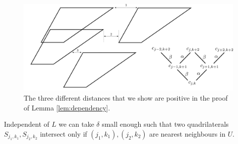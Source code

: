 \begin{figure}[!h]
  \includegraphics[width=\linewidth]{construction_intersections}
  \caption{The three different distances that we show are positive in the proof of Lemma \ref{lem:dependency}. }
  \label{fig:construction_intersections}
\end{figure}
\begin{lemma}\label{lem:dependency}
Independent of $L$ we can take $\delta$ small enough such that two quadrilaterals $S_{j_1,k_1}, S_{j_2, k_2}$ intersect only if $(j_1, k_1), (j_2, k_2)$ are nearest neighbours in $U$. 
\end{lemma}

